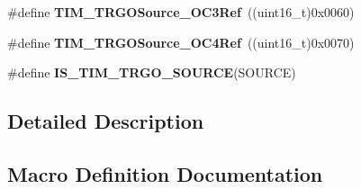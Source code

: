 \begin{DoxyCompactItemize}
\item 
\#define {\bfseries T\+I\+M\+\_\+\+T\+R\+G\+O\+Source\+\_\+\+O\+C3\+Ref}~((uint16\+\_\+t)0x0060)\hypertarget{group___t_i_m___trigger___output___source_ga40943bc1c3f22b983c683cbf0e87a218}{}\label{group___t_i_m___trigger___output___source_ga40943bc1c3f22b983c683cbf0e87a218}

\item 
\#define {\bfseries T\+I\+M\+\_\+\+T\+R\+G\+O\+Source\+\_\+\+O\+C4\+Ref}~((uint16\+\_\+t)0x0070)\hypertarget{group___t_i_m___trigger___output___source_gafc81561599199912d613c65f760919bc}{}\label{group___t_i_m___trigger___output___source_gafc81561599199912d613c65f760919bc}

\item 
\#define {\bfseries I\+S\+\_\+\+T\+I\+M\+\_\+\+T\+R\+G\+O\+\_\+\+S\+O\+U\+R\+CE}(S\+O\+U\+R\+CE)
\end{DoxyCompactItemize}


\subsection{Detailed Description}


\subsection{Macro Definition Documentation}
